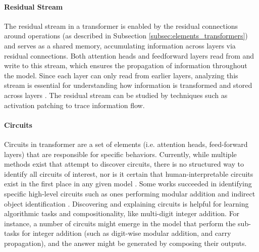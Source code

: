 \paragraph{Residual Stream}
The residual stream in a transformer is enabled by the residual connections around operations (as described in Subsection \ref{subsec:elements_transformers}) and serves as a shared memory, accumulating information across layers via residual connections. Both attention heads and feedforward layers read from and write to this stream, which ensures the propagation of information throughout the model. Since each layer can only read from earlier layers, analyzing this stream is essential for understanding how information is transformed and stored across layers \parencite{elhage2021mathematical}. The residual stream can be studied by techniques such as activation patching to trace information flow.

\paragraph{Circuits}
Circuits in transformer are a set of elements (i.e. attention heads, feed-forward layers) that are responsible for specific behaviors. Currently, while multiple methods exist that attempt to discover circuits, there is no structured way to identify all circuits of interest, nor is it certain that human-interpretable circuits exist in the first place in any given model \parencite{ferrando_primer_2024}. Some works succeeded in identifying specific high-level circuits such as ones performing modular addition \parencite{nanda_progress_2022,zhong_clock_2023} and indirect object identification \parencite{wang_interpretability_2022}. Discovering and explaining circuits is helpful for learning algorithmic tasks and compositionality, like multi-digit integer addition. For instance, a number of circuits might emerge in the model that perform the sub-tasks for integer addition (such as digit-wise modular addition, and carry propagation), and the answer might be generated by composing their outputs.


